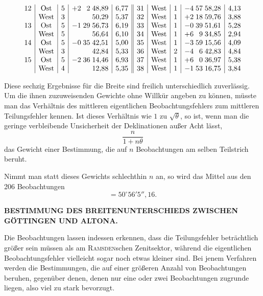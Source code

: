 {\[\begin{array}{@{}r|c|c|r@{\;}r@{\;}r|r||r|c|c|r@{\;}r@{\;}r|r@{}}
12&\text{Ost}&5&+2&2&48{,}89&6{,}77&31&\text{West}&1&-4&57&58{,}28&4{,}13\\
&\text{West}&3&&&50{,}29&5{,}37&32&\text{West}&1&+2&18&59{,}76&3{,}88\\
13&\text{Ost}&5&-1&29&56{,}73&6{,}19&33&\text{West}&1&-0&39&51{,}61&5{,}28\\
&\text{West}&5&&&56{,}64&6{,}10&34&\text{West}&1&+6&9&34{,}85&2{,}94\\
14&\text{Ost}&5&-0&35&42{,}51&5{,}00&35&\text{West}&1&-3&59&15{,}56&4{,}09\\
&\text{West}&3&&&42{,}84&5{,}33&36&\text{West}&2&-4&6&42{,}83&4{,}84\\
15&\text{Ost}&5&-2&36&14{,}46&6{,}93&37&\text{West}&1&+6&0&36{,}97&5{,}38\\
&\text{West}&4&&&12{,}88&5{,}35&38&\text{West}&1&-1&53&16{,}75&3{,}84
\end{array}
\]
\par
}

Diese sechzig Ergebnisse für die Breite sind freilich unterschiedlich zuverlässig.
Um die ihnen zuzuweisenden Gewichte ohne Willkür angeben zu können, müsste man das
Verhältnis des mittleren eigentlichen Beobachtungsfehlers zum mittleren Teilungsfehler
kennen. Ist dieses Verhältnis wie \(1\) zu \(\surd\theta\), so ist, wenn man die
geringe verbleibende Unsicherheit der Deklinationen außer Acht lässt,
\[
\frac n{1+n\theta}
\]
\noindent das Gewicht einer Bestimmung, die auf \(n\) Beobachtungen am selben
Teilstrich beruht.

Nimmt man statt dieses Gewichts schlechthin \(n\) an, so wird das Mittel
aus den 206 Beobachtungen
\[
=50^\circ56'5''{,}16.
\]

\par\clearpage
\noindent{}\parbox[t]{\dimexpr\linewidth-24mm\relax}{\centering\scriptsize\bfseries BESTIMMUNG DES BREITENUNTERSCHIEDS ZWISCHEN GÖTTINGEN UND ALTONA.}\makebox[12mm][r]{}\par\medskip

Die Beobachtungen lassen indessen erkennen, dass die Teilungsfehler beträchtlich
größer sein müssen als am \textsc{Ramsden}schen Zenitsektor, während die eigentlichen
Beobachtungsfehler vielleicht sogar noch etwas kleiner sind. Bei jenem Verfahren
werden die Bestimmungen, die auf einer größeren Anzahl von Beobachtungen beruhen,
gegenüber denen, denen nur eine oder zwei Beobachtungen zugrunde liegen, also
viel zu stark bevorzugt.


